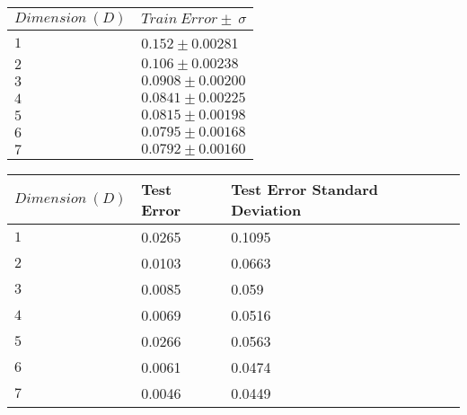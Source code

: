 \documentclass[
]{article}
\author{}
\date{}
\begin{document}
\begin{longtable}[]{@{}ll@{}}
\toprule
\(Dimension\ (D)\) & \(Train\ Error \pm \ \sigma\)\tabularnewline
\midrule
\endhead
\(1\) & \(0.152 \pm\)0.00281\tabularnewline
\(2\) & \(0.106 \pm 0.00238\)\tabularnewline
\(3\) & \(0.0908 \pm 0.00200\)\tabularnewline
\(4\) & \(0.0841 \pm 0.00225\)\tabularnewline
\(5\) & \(0.0815 \pm 0.00198\)\tabularnewline
\(6\) & \(0.0795 \pm 0.00168\)\tabularnewline
\(7\) & \(0.0792 \pm 0.00160\)\tabularnewline
\bottomrule
\end{longtable}

\begin{longtable}[]{@{}lll@{}}
\toprule
\(Dimension\ (D)\) & Test Error & Test Error Standard
Deviation\tabularnewline
\midrule
\endhead
\(1\) & 0.0265 & 0.1095\tabularnewline
\(2\) & 0.0103 & 0.0663\tabularnewline
\(3\) & 0.0085 & 0.059\tabularnewline
\(4\) & 0.0069 & 0.0516\tabularnewline
\(5\) & 0.0266 & 0.0563\tabularnewline
\(6\) & 0.0061 & 0.0474\tabularnewline
\(7\) & 0.0046 & 0.0449\tabularnewline
\bottomrule
\end{longtable}
\end{document}
